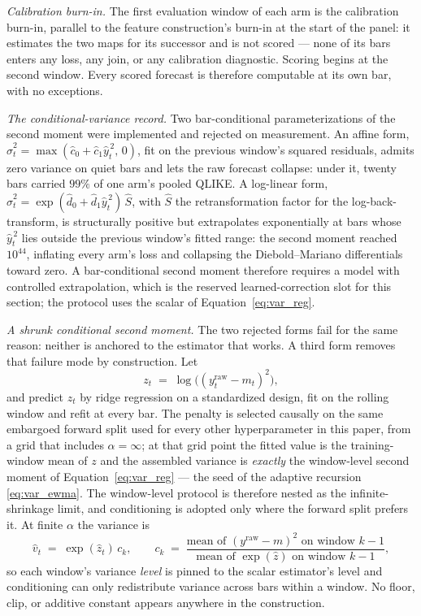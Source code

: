\emph{Calibration burn-in.} The first evaluation window of each arm is
the calibration burn-in, parallel to the feature construction's burn-in
at the start of the panel: it estimates the two maps for its successor
and is not scored --- none of its bars enters any loss, any join, or any
calibration diagnostic. Scoring begins at the second window. Every
scored forecast is therefore computable at its own bar, with no
exceptions.

\emph{The conditional-variance record.} Two bar-conditional
parameterizations of the second moment were implemented and rejected on
measurement. An affine form,
$\hat{\sigma}^2_t = \max(\hat{c}_0 + \hat{c}_1 \hat{y}_t^{\,2},\, 0)$,
fit on the previous window's squared residuals, admits zero variance on
quiet bars and lets the raw forecast collapse: under it, twenty bars
carried $99\%$ of one arm's pooled QLIKE. A log-linear form,
$\hat{\sigma}^2_t
= \exp(\hat{d}_0 + \hat{d}_1 \hat{y}_t^{\,2})\,\hat{S}$, with $\hat{S}$
the \citet{Duan1983} retransformation factor for the log-back-transform, is
structurally positive but extrapolates exponentially at bars whose
$\hat{y}_t^{\,2}$ lies outside the previous window's fitted range: the
second moment reached $10^{44}$, inflating every arm's loss and
collapsing the Diebold--Mariano differentials toward zero. A
bar-conditional second moment therefore requires a model with controlled
extrapolation, which is the reserved learned-correction slot for this
section; the protocol uses the scalar of Equation~\eqref{eq:var_reg}.

\emph{A shrunk conditional second moment.} The two rejected forms fail
for the same reason: neither is anchored to the estimator that works.
A third form removes that failure mode by construction. Let
\[
z_t \;=\; \log\bigl( (y^{\mathrm{raw}}_t - m_t)^2 \bigr),
\]
and predict $z_t$ by ridge regression on a standardized design, fit on
the rolling window and refit at every bar. The penalty is selected
causally on the same embargoed forward split used for every other
hyperparameter in this paper, from a grid that includes
$\alpha = \infty$; at that grid point the fitted value is the
training-window mean of $z$ and the assembled variance is
\emph{exactly} the window-level second moment of
Equation~\eqref{eq:var_reg} --- the seed of the adaptive recursion
\eqref{eq:var_ewma}. The window-level protocol is therefore nested as
the infinite-shrinkage limit, and conditioning is adopted only where the
forward split prefers it. At finite $\alpha$ the variance is
\[
\hat{v}_t \;=\; \exp(\hat{z}_t)\, c_k,
\qquad
c_k \;=\;
\frac{\text{mean of } (y^{\mathrm{raw}} - m)^2 \text{ on window } k-1}
     {\text{mean of } \exp(\hat{z}) \text{ on window } k-1},
\]
so each window's variance \emph{level} is pinned to the scalar
estimator's level and conditioning can only redistribute variance across
bars within a window. No floor, clip, or additive constant appears
anywhere in the construction.

